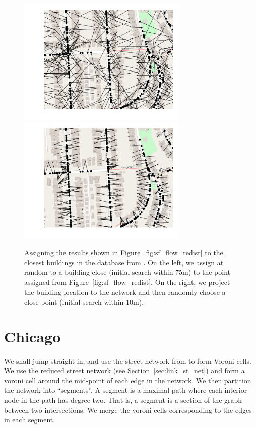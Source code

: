 \documentclass[twoside,a4paper,twocolumn,10pt]{article}
\theoremstyle{plain}
\theoremstyle{definition}
\begin{document}
\begin{figure}
  \includegraphics[width=3.2in]{sf_flow_to_buildings_1.png}
  \includegraphics[width=3.2in]{sf_flow_to_buildings_2.png}
  \caption{Assigning the results shown in Figure~\ref{fig:sf_flow_redist} to the closest
  buildings in the database from \cite{oa}.  On the left, we assign at random to a building
  close (initial search within 75m) to the point assigned from Figure~\ref{fig:sf_flow_redist}.
  On the right, we project the building location to the network and then randomly choose
  a close point (initial search within 10m).}
  \label{fig:sf_build_1}
\end{figure}



\section{Chicago}\label{chicago_redist_1}

We shall jump straight in, and use the street network from \cite{tiger} to form Voroni cells.
We use the reduced street network (see Section~\ref{sec:link_st_net}) and form a voroni
cell around the mid-point of each edge in the network.  We then partition the network into
``segments''.  A segment is a maximal path where each interior node in the path has degree two.
That is, a segment is a section of the graph between two intersections.  We merge the voroni
cells corresponding to the edges in each segment.
\end{document}
